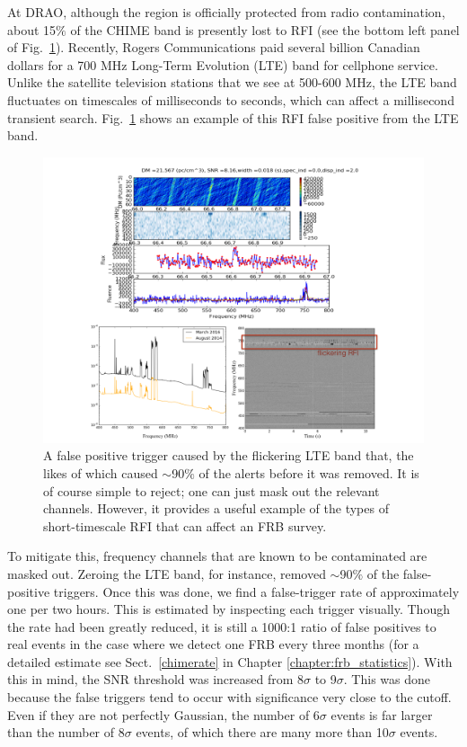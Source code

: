 At DRAO, although the region is officially 
protected from radio contamination, about 15$\%$ of the CHIME
band is presently lost to RFI (see the bottom left 
panel of Fig.~\ref{fig-lte_trigger}). Recently, Rogers Communications 
paid several billion Canadian dollars for a 700 MHz 
Long-Term Evolution (LTE) band for cellphone service.
Unlike the satellite television stations that we see at 500-600 MHz, 
the LTE band fluctuates on timescales of milliseconds to seconds, 
which can affect a millisecond transient search. 
Fig.~\ref{fig-lte_trigger} shows an example of this RFI false 
positive from the LTE band. 


\begin{figure}[!h]
\label{fig-lte_trigger}
\begin{center}
\includegraphics[trim={0in 0in 0in 0in}, scale=0.5]
{./figures/beamforming/lte_trigger.png}
\vspace{0.0cm}
\caption[abc]{A false positive trigger caused by the flickering 
LTE band that, the likes of which 
caused $\sim$90$\%$ of the alerts before it was removed.
It is of course simple to reject; one can just mask 
out the relevant channels.
However, it provides a useful example of the types of 
short-timescale RFI that can affect an FRB survey.}
\end{center}
\end{figure}


To mitigate this, frequency channels that are known 
to be contaminated are masked out. Zeroing the LTE band,
for instance, removed $\sim$90$\%$ of the false-positive triggers. 
Once this was done, we find a false-trigger rate of 
approximately one per two hours. This is estimated 
by inspecting each trigger visually. Though the rate 
had been greatly reduced, it is still a 1000:1 ratio of 
false positives to real events in the case where we detect 
one FRB every three months (for a detailed estimate see Sect.~\ref{chimerate}
in Chapter \ref{chapter:frb_statistics}). With this in mind, 
the SNR threshold was increased from 8$\sigma$ to 9$\sigma$. 
This was done because the false triggers tend to occur 
with significance very close to the cutoff. Even if they are 
not perfectly Gaussian, the number of 6$\sigma$ events is 
far larger than the number of 8$\sigma$ events, of which 
there are many more than 10$\sigma$ events. 

